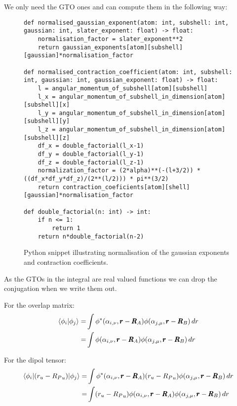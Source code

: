 We only need the GTO ones and can compute them in the following way:
\begin{figure}[H]
\begin{verbatim}
def normalised_gaussian_exponent(atom: int, subshell: int, gaussian: int, slater_exponent: float) -> float:
    normalisation_factor = slater_exponent**2
    return gaussian_exponents[atom][subshell][gaussian]*normalisation_factor

def normalised_contraction_coefficient(atom: int, subshell: int, gaussian: int, gaussian_exponent: float) -> float:
    l = angular_momentum_of_subshell[atom][subshell]
    l_x = angular_momentum_of_subshell_in_dimension[atom][subshell][x]
    l_y = angular_momentum_of_subshell_in_dimension[atom][subshell][y]
    l_z = angular_momentum_of_subshell_in_dimension[atom][subshell][z]
    df_x = double_factorial(l_x-1)
    df_y = double_factorial(l_y-1)
    df_z = double_factorial(l_z-1)
    normalization_factor = (2*alpha)**(-(l+3/2)) * ((df_x*df_y*df_z)/(2**(l/2))) * pi**(3/2)
    return contraction_coeficients[atom][shell][gaussian]*normalisation_factor

def double_factorial(n: int) -> int:
    if n <= 1:
        return 1
    return n*double_factorial(n-2)
\end{verbatim}
    \caption{Python snippet illustrating normalisation of the gaussian exponents and contraction coefficients.}
\end{figure}

As the GTOs in the integral are real valued functions we can drop the conjugation when we write them out.

For the overlap matrix:
\begin{align}
        \braket{\phi_i|\phi_j} = &\int \phi^*(\alpha_{i,\nu},\pmb r-\pmb R_A)\phi(\alpha_{j,\mu},\pmb r-\pmb R_B)\,dr\\
        =&\int \phi(\alpha_{i,\nu},\pmb r-\pmb R_A)\phi(\alpha_{j,\mu},\pmb r-\pmb R_B)\,dr\notag
\end{align}

For the dipol tensor:
\begin{align}
        \braket{\phi_i|(r_u-{R_P}_u)|\phi_j} = &\int \phi^*(\alpha_{i,\nu},\pmb r-\pmb R_A)(r_u-{R_P}_u)\phi(\alpha_{j,\mu},\pmb r-\pmb R_B)\,dr\\
        =&\int (r_u-{R_P}_u)\phi(\alpha_{i,\nu},\pmb r-\pmb R_A)\phi(\alpha_{j,\mu},\pmb r-\pmb R_B)\,dr\notag
\end{align}

